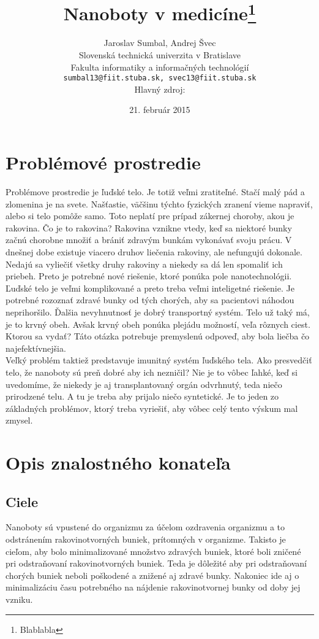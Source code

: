 \documentclass[10pt,twoside,slovak,a4paper]{article}
\title{Nanoboty v medicíne\thanks{Blablabla}} %
\author{Jaroslav Sumbal, Andrej Švec\\[2pt]
	{\small Slovenská technická univerzita v Bratislave}\\
	{\small Fakulta informatiky a informačných technológií}\\
	{\small \texttt{sumbal13@fiit.stuba.sk, svec13@fiit.stuba.sk}}\\
	{\small Hlavný zdroj: \cite{Zdroj}}
	}
\date{\small 21. február 2015} %
\begin{document}
\maketitle


\begin{abstract}


\end{abstract}

\section{Problémové prostredie}

Problémove prostredie je ľuďské telo. Je totiž veľmi zratiteľné. Stačí malý pád a zlomenina je na svete. Našťastie, väčšinu týchto fyzických zranení vieme napraviť, alebo si telo pomôže samo. Toto neplatí pre prípad zákernej choroby, akou je rakovina. Čo je to rakovina? Rakovina vznikne vtedy, keď sa niektoré bunky začnú chorobne množiť a brániť zdravým bunkám vykonávať svoju prácu. V dnešnej dobe existuje viacero druhov liečenia rakoviny, ale nefungujú dokonale. Nedajú sa vyliečiť všetky druhy rakoviny a niekedy sa dá len spomaliť ich priebeh. Preto je potrebné nové riešenie, ktoré ponúka pole nanotechnológii.
\\
Ľuďské telo je veľmi komplikované a preto treba veľmi inteligetné riešenie. Je potrebné rozoznať zdravé bunky od tých chorých, aby sa pacientovi náhodou neprihoršilo. Ďalšia nevyhnutnosť je dobrý transportný systém. Telo už taký má, je to krvný obeh. Avšak krvný obeh ponúka plejádu možností, veľa rôznych ciest. Ktorou sa vydať? Táto otázka potrebuje premyslenú odpoveď, aby bola liečba čo najefektívnejšia.
\\
Veľký problém taktiež predstavuje imunitný systém ľuďského tela. Ako presvedčiť telo, že nanoboty sú preň dobré aby ich nezničil? Nie je to vôbec ľahké, keď si uvedomíme, že niekedy je aj transplantovaný orgán odvrhnutý, teda niečo prirodzené telu. A tu je treba aby prijalo niečo syntetické. Je to jeden zo základných problémov, ktorý treba vyriešiť, aby vôbec celý tento výskum mal zmysel.

\section{Opis znalostného konateľa}

\subsection{Ciele}
Nanoboty sú vpustené do organizmu za účelom ozdravenia organizmu a to odstránením rakovinotvorných buniek, prítomných v organizme. Takisto je cieľom, aby bolo minimalizované množstvo zdravých buniek, ktoré boli zničené pri odstraňovaní rakovinotvorných buniek. Teda je dôležité aby pri odstraňovaní chorých buniek neboli poškodené a znižené aj zdravé bunky. Nakoniec ide aj o minimalizáciu času potrebného na nájdenie rakovinotvornej bunky od doby jej vzniku.
\end{document}
